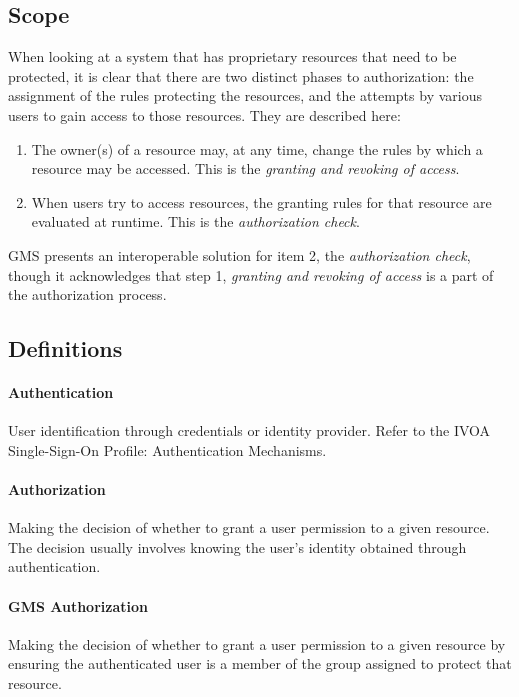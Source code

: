 \documentclass[11pt,a4paper]{ivoa}
\begin{document}
\subsection{Scope}

When looking at a system that has proprietary resources that need to be protected, it is clear that there are two distinct phases to authorization:  the assignment of the rules protecting the resources, and the attempts by various users to gain access to those resources.  They are described here:

\begin{enumerate}
\item The owner(s) of a resource may, at any time, change the rules by which a resource may be accessed. This is the \emph{granting and revoking of access}.
\item When users try to access resources, the granting rules for that resource are evaluated at runtime. This is the \emph{authorization check}.
\end{enumerate}

GMS presents an interoperable solution for item 2, the \emph{authorization check}, though it acknowledges that step 1, \emph{granting and revoking of access} is a part of the authorization process.

\subsection{Definitions}

\paragraph{Authentication} User identification through credentials or identity provider.  Refer to the IVOA Single-Sign-On Profile: Authentication Mechanisms.  \citep{2017ivoa.spec.0524T}

\paragraph{Authorization} Making the decision of whether to grant a user permission to a given resource.  The decision usually involves knowing the user's identity obtained through authentication.

\paragraph{GMS Authorization} Making the decision of whether to grant a user permission to a given resource by ensuring the authenticated user is a member of the group assigned to protect that resource.
\end{document}
